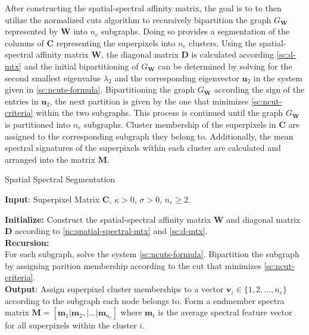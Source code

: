 After constructing the spatial-spectral affinity matrix, the goal is to to then utilize the normalized cuts algorithm to recursively bipartition the graph $G_\mathbf{W}$ represented by $\mathbf{W}$ into $n_e$ subgraphs. Doing so provides a segmentation of the columns of $\mathbf{C}$ representing the superpixels into $n_e$ clusters. Using the spatial-spectral affinity matrix $\mathbf{W}$, the diagonal matrix $\mathbf{D}$ is calculated according \eqref{sc:d-mtx} and the initial bipartitioning of $G_\mathbf{W}$ can be determined by solving for the second smallest eigenvalue $\lambda_2$ and the corresponding eigenvector $\mathbf{u}_2$ in the system given in \eqref{sc:ncuts-formula}. Bipartitioning the graph $G_\mathbf{W}$ according the sign of the entries in $\mathbf{u}_2$, the next partition is given by the one that minimizes \eqref{sc:ncut-criteria} within the two subgraphs. This process is continued until the graph $G_\mathbf{W}$ is partitioned into $n_e$ subgraphs. Cluster membership of the superpixels in $\mathbf{C}$ are assigned to the corresponding subgraph they belong to. Additionally, the mean spectral signatures of the superpixels within each cluster are calculated and arranged into the matrix $\mathbf{M}$.

\begin{algorithm}[H]
    \label{Spatial Spectral Segmentation}
    \caption{Spatial Spectral Segmentation}
    \textbf{Input}: Superpixel Matrix $\mathbf{C}$, $\kappa > 0$, $\sigma > 0$, $n_e \geq 2$.

    \textbf{Initialize:} Construct the spatial-spectral affinity matrix $\mathbf{W}$ and diagonal matrix $\mathbf{D}$ according to \eqref{nc:spatial-spectral-mtx} and \eqref{sc:d-mtx}.\\

    \textbf{Recursion:}\\
        \quad For each subgraph, solve the system \eqref{sc:ncuts-formula}. Bipartition the subgraph by assigning parition membership according to the cut that minimizes \eqref{sc:ncut-criteria}. 
    \\

    \textbf{Output}: Assign superpixel cluster memberships to a vector $\mathbf{v}_i \in \{1, 2, \dots ,n_e\}$ according to the subgraph each node belongs to. Form a endmember spectra matrix $\mathbf{M} = [ \mathbf{m}_1 | \mathbf{m}_2, | \dots | \mathbf{m}_{n_e} ]$ where $\mathbf{m}_i$ is the average spectral feature vector for all superpixels within the cluster $i$.
\end{algorithm}

